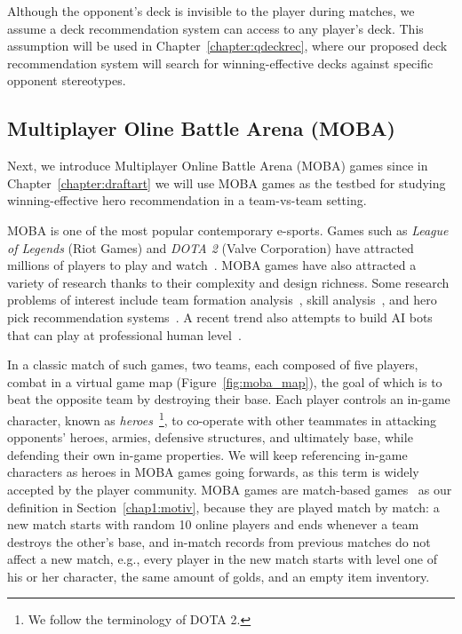Although the opponent's deck is invisible to the player during matches, we assume a deck recommendation system can access to any player's deck. This assumption will be used in Chapter~\ref{chapter:qdeckrec}, where our proposed deck recommendation system will search for winning-effective decks against specific opponent stereotypes. 


\subsection{Multiplayer Oline Battle Arena (MOBA)}
Next, we introduce Multiplayer Online Battle Arena (MOBA) games since in Chapter~\ref{chapter:draftart} we will use MOBA games as the testbed for studying winning-effective hero recommendation in a team-vs-team setting.

MOBA is one of the most popular contemporary e-sports. Games such as \textit{League of Legends} (Riot Games) and \textit{DOTA 2} (Valve Corporation) have attracted millions of players to play and watch~\cite{lol_fanbase,lol_27million}. MOBA games have also attracted a variety of research thanks to their complexity and design richness. Some research problems of interest include team formation analysis~\cite{pobie1,pobie2,neidhardt2015team,kim2016proficiency}, skill analysis~\cite{zhengxing2016player,Drachen:skill}, and hero pick recommendation systems~\cite{summerville2017reco,hanke2017reco}. A recent trend also attempts to build AI bots that can play at professional human level~\cite{openaidota}. 

In a classic match of such games, two teams, each composed of five players, combat in a virtual game map (Figure~\ref{fig:moba_map}), the goal of which is to beat the opposite team by destroying their base. Each player controls an in-game character, known as \textit{heroes}~\footnote{We follow the terminology of DOTA 2.}, to co-operate with other teammates in attacking opponents' heroes, armies, defensive structures, and ultimately base, while defending their own in-game properties. We will keep referencing in-game characters as heroes in MOBA games going forwards, as this term is widely accepted by the player community. MOBA games are match-based games~\cite{guo2012analysis} as our definition in Section~\ref{chap1:motiv}, because they are played match by match: a new match starts with random 10 online players and ends whenever a team destroys the other's base, and in-match records from previous matches do not affect a new match, e.g., every player in the new match starts with level one of his or her character, the same amount of golds, and an empty item inventory.


